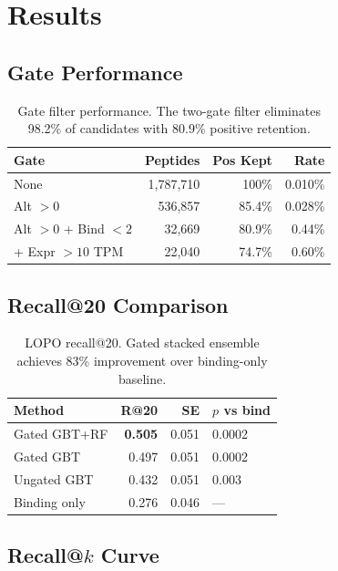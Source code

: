 \documentclass[11pt,twocolumn]{article}
\begin{document}
\section{Results}

\subsection{Gate Performance}

\begin{table}[h]
\centering
\small
\begin{tabular}{lrrr}
\toprule
\textbf{Gate} & \textbf{Peptides} & \textbf{Pos Kept} & \textbf{Rate} \\
\midrule
None & 1,787,710 & 100\% & 0.010\% \\
Alt $> 0$ & 536,857 & 85.4\% & 0.028\% \\
Alt $> 0$ + Bind $< 2$ & 32,669 & 80.9\% & 0.44\% \\
+ Expr $> 10$ TPM & 22,040 & 74.7\% & 0.60\% \\
\bottomrule
\end{tabular}
\caption{Gate filter performance. The two-gate filter eliminates 98.2\% of
candidates with 80.9\% positive retention.}
\end{table}

\subsection{Recall@20 Comparison}

\begin{table}[h]
\centering
\small
\begin{tabular}{lrrl}
\toprule
\textbf{Method} & \textbf{R@20} & \textbf{SE} & \textbf{$p$ vs bind} \\
\midrule
Gated GBT+RF & \textbf{0.505} & 0.051 & 0.0002 \\
Gated GBT & 0.497 & 0.051 & 0.0002 \\
Ungated GBT & 0.432 & 0.051 & 0.003 \\
Binding only & 0.276 & 0.046 & --- \\
\bottomrule
\end{tabular}
\caption{LOPO recall@20. Gated stacked ensemble achieves 83\% improvement
over binding-only baseline.}
\end{table}

\subsection{Recall@$k$ Curve}
\end{document}
